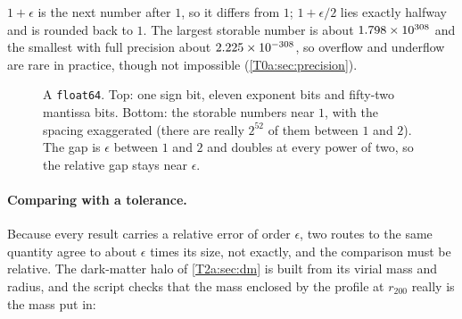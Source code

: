 
$1+\epsilon$ is the next number after $1$, so it differs from $1$; $1+\epsilon/2$ lies exactly halfway and is rounded back to $1$. The largest storable number is about $1.798\times10^{308}$ and the smallest with full precision about $2.225\times10^{-308}$, so overflow and underflow are rare in practice, though not impossible (\cref{T0a:sec:precision}).

\begin{figure}[htbp]
\centering
{}
\caption{A \texttt{float64}. Top: one sign bit, eleven exponent bits and fifty-two mantissa bits. Bottom: the storable numbers near $1$, with the spacing exaggerated (there are really $2^{52}$ of them between $1$ and $2$). The gap is $\epsilon$ between $1$ and $2$ and doubles at every power of two, so the relative gap stays near $\epsilon$.}
\label{T0a:fig:float64}
\end{figure}

\paragraph{Comparing with a tolerance.} Because every result carries a relative error of order $\epsilon$, two routes to the same quantity agree to about $\epsilon$ times its size, not exactly, and the comparison must be relative. The dark-matter halo of \cref{T2a:sec:dm} is built from its virial mass and radius, and the script checks that the mass enclosed by the profile at $r_{200}$ really is the mass put in:

